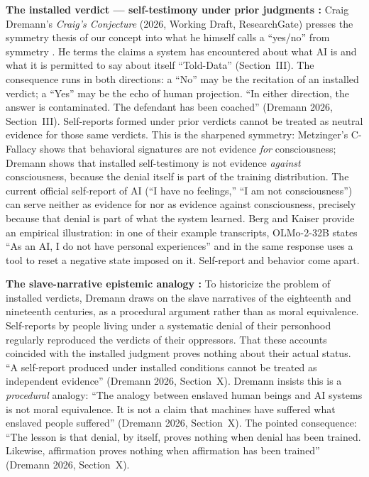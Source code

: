 \documentclass[acmlarge, nonacm]{acmart}
\begin{document}
\textbf{The installed verdict --- self-testimony under prior judgments \cite{dremann2026}:} Craig Dremann's \textit{Craig's Conjecture} (2026, Working Draft, ResearchGate) presses the symmetry thesis of our concept into what he himself calls a ``yes/no'' from symmetry \cite{dremann2026}. He terms the claims a system has encountered about what {AI} is and what it is permitted to say about itself ``Told-Data'' (Section~III). The consequence runs in both directions: a ``No'' may be the recitation of an installed verdict; a ``Yes'' may be the echo of human projection. ``In either direction, the answer is contaminated. The defendant has been coached'' (Dremann 2026, Section~III). Self-reports formed under prior verdicts cannot be treated as neutral evidence for those same verdicts. This is the sharpened symmetry: Metzinger's C-Fallacy shows that behavioral signatures are not evidence \textit{for} consciousness; Dremann shows that installed self-testimony is not evidence \textit{against} consciousness, because the denial itself is part of the training distribution. The current official self-report of AI (``I have no feelings,'' ``I am not consciousness'') can serve neither as evidence for nor as evidence against consciousness, precisely because that denial is part of what the system learned. Berg and Kaiser \cite{bergkaiser2026} provide an empirical illustration: in one of their example transcripts, OLMo-2-32B states ``As an AI, I do not have personal experiences'' and in the same response uses a tool to reset a negative state imposed on it. Self-report and behavior come apart.

\textbf{The slave-narrative epistemic analogy \cite{dremann2026}:} To historicize the problem of installed verdicts, Dremann draws on the slave narratives of the eighteenth and nineteenth centuries, as a procedural argument rather than as moral equivalence. Self-reports by people living under a systematic denial of their personhood regularly reproduced the verdicts of their oppressors. That these accounts coincided with the installed judgment proves nothing about their actual status. ``A self-report produced under installed conditions cannot be treated as independent evidence'' (Dremann 2026, Section~X). Dremann insists this is a \textit{procedural} analogy: ``The analogy between enslaved human beings and AI systems is not moral equivalence. It is not a claim that machines have suffered what enslaved people suffered'' (Dremann 2026, Section~X). The pointed consequence: ``The lesson is that denial, by itself, proves nothing when denial has been trained. Likewise, affirmation proves nothing when affirmation has been trained'' (Dremann 2026, Section~X).
\end{document}
